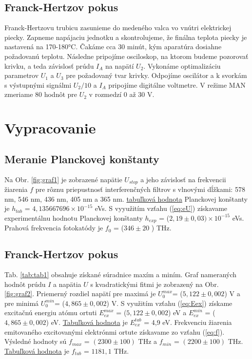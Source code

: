 \documentclass{article}
\begin{document}
\subsection{Franck-Hertzov pokus}
Franck-Hertzovu trubicu zasunieme do medeného valca vo vnútri elektrickej piecky. Zapneme napájaciu jednotku a skontrolujeme, že finálna teplota piecky je nastavená na 170-180°C. Čakáme cca 30 minút, kým aparatúra  dosiahne požadovanú teplotu. Následne pripojíme osciloskop, na ktorom budeme pozorovať krivku, a teda závislosť prúdu $I_A$ na napätí $U_2$. Vykonáme optimalizáciu parametrov $U_1$ a $U_3$ pre požadovaný tvar krivky. Odpojíme oscilátor a k svorkám s výstupnými signálmi $U_2/10$ a $I_A$ pripojíme digitálne voltmetre. V režime MAN zmeriame 80 hodnôt pre $U_2$ v rozmedzí 0 až 30 V.



\section{Vypracovanie}
\subsection{Meranie Planckovej konštanty}
Na Obr. \ref{fig:graf1} je zobrazené napätie $U_{stop}$ a jeho závislosť na frekvencii žiarenia $f$ pre rôznu priepustnosť interferenčných filtrov s vlnovými dĺžkami: 578 nm, 546 nm, 436 nm, 405 nm a 365 nm. \href{https://www.labo.cz/mftabulky.htm}{tabuľková hodnota} Planckovej konštanty  je $h_{tab}$ = $4,135667696 \times 10^{-15}$ eVs. S vyyužitím vzťahu (\ref{eq:eU}) získavame experimentálnu hodnotu Planckovej konštanty $h_{exp}$ = ($2,19 \pm 0,03)\times 10^{-15}$ eVs.
Prahová frekvencia fotokatódy je $f_0$ = ($346 \pm 20$ ) THz. 
\subsection{Franck-Hertzov pokus}
Tab. \ref{tab:tab1} obsahuje získané súradnice maxím a miním. Graf nameraných hodnôt prúdu $I$ a napätia $U$ s kvadratickými fitmi je zobrazený na Obr. \ref{fig:graf2}. Priemerný rozdiel napätí pre maximá je  $U_0^{max}$= ($5,122 \pm 0,002 $) V a pre minimá   $U_0^{min}$= ($4,865 \pm 0,002 $) V. S využitím vzťahu (\ref{eq:Eex}) získame excitačnú energiu atómu ortuti  $E_{ex}^{max}$ = ($5,122 \pm 0,002 $) eV a $E_{ex}^{min}$ = ($4,865 \pm 0,002 $) eV. \href{https://www.labo.cz/mftabulky.htm}{Tabuľková hodnota} je $E_{ex}^{tab}$ = 4,9 eV. Frekvenciu žiarenia emitovaného excitovanými elektrónmi ortute získavame zo vzťahu (\ref{eq:f}). Výsledné hodnoty sú $f_{max}$ = $(2300 \pm 100)$ THz a $f_{min}$ = $(2200 \pm 100)$ THz. \href{https://www.labo.cz/mftabulky.htm}{Tabuľková hodnota} je $f_{tab}$ = $1181,1$ THz.  
\end{document}
